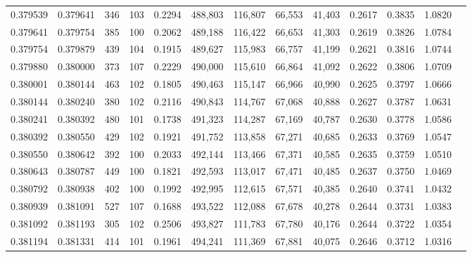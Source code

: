 \begin{tabular}{rrrrrrrrrrrrr}
0.379539 & 0.379641 &   346 & 103 &                                     0.2294 & 488,803 & 116,807 &  66,553 &  41,403 & 0.2617 & 0.3835 & 1.0820 \\
0.379641 & 0.379754 &   385 & 100 &                                     0.2062 & 489,188 & 116,422 &  66,653 &  41,303 & 0.2619 & 0.3826 & 1.0784 \\
0.379754 & 0.379879 &   439 & 104 &                                     0.1915 & 489,627 & 115,983 &  66,757 &  41,199 & 0.2621 & 0.3816 & 1.0744 \\
0.379880 & 0.380000 &   373 & 107 &                                     0.2229 & 490,000 & 115,610 &  66,864 &  41,092 & 0.2622 & 0.3806 & 1.0709 \\
0.380001 & 0.380144 &   463 & 102 &                                     0.1805 & 490,463 & 115,147 &  66,966 &  40,990 & 0.2625 & 0.3797 & 1.0666 \\
0.380144 & 0.380240 &   380 & 102 &                                     0.2116 & 490,843 & 114,767 &  67,068 &  40,888 & 0.2627 & 0.3787 & 1.0631 \\
0.380241 & 0.380392 &   480 & 101 &                                     0.1738 & 491,323 & 114,287 &  67,169 &  40,787 & 0.2630 & 0.3778 & 1.0586 \\
0.380392 & 0.380550 &   429 & 102 &                                     0.1921 & 491,752 & 113,858 &  67,271 &  40,685 & 0.2633 & 0.3769 & 1.0547 \\
0.380550 & 0.380642 &   392 & 100 &                                     0.2033 & 492,144 & 113,466 &  67,371 &  40,585 & 0.2635 & 0.3759 & 1.0510 \\
0.380643 & 0.380787 &   449 & 100 &                                     0.1821 & 492,593 & 113,017 &  67,471 &  40,485 & 0.2637 & 0.3750 & 1.0469 \\
0.380792 & 0.380938 &   402 & 100 &                                     0.1992 & 492,995 & 112,615 &  67,571 &  40,385 & 0.2640 & 0.3741 & 1.0432 \\
0.380939 & 0.381091 &   527 & 107 &                                     0.1688 & 493,522 & 112,088 &  67,678 &  40,278 & 0.2644 & 0.3731 & 1.0383 \\
0.381092 & 0.381193 &   305 & 102 &                                     0.2506 & 493,827 & 111,783 &  67,780 &  40,176 & 0.2644 & 0.3722 & 1.0354 \\
0.381194 & 0.381331 &   414 & 101 &                                     0.1961 & 494,241 & 111,369 &  67,881 &  40,075 & 0.2646 & 0.3712 & 1.0316 \\

\end{tabular}
